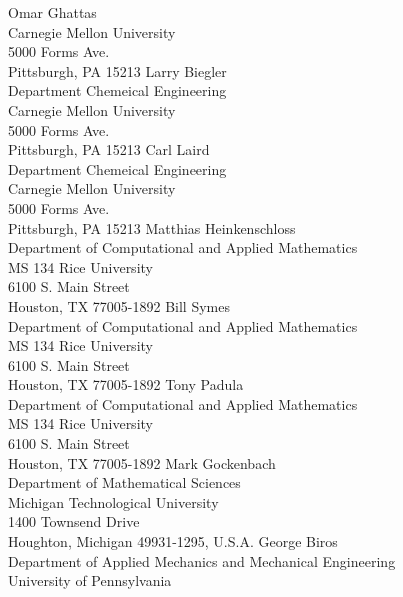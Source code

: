 \documentclass[pdf,ps2pdf,11pt]{SANDreport}
\begin{document}
%
\appendix


\begin{SANDdistribution}
 Omar Ghattas \\ Carnegie Mellon University\\5000 Forms Ave.\\Pittsburgh, PA 15213
 Larry Biegler \\ Department Chemeical Engineering\\Carnegie Mellon University\\5000 Forms Ave.\\Pittsburgh, PA 15213
 Carl Laird \\ Department Chemeical Engineering\\Carnegie Mellon University\\5000 Forms Ave.\\Pittsburgh, PA 15213
 Matthias Heinkenschloss \\ Department of Computational and Applied Mathematics\\MS 134 Rice University\\
6100 S. Main Street\\Houston, TX 77005-1892
 Bill Symes\\Department of Computational and Applied Mathematics\\MS 134 Rice University\\
6100 S. Main Street\\Houston, TX 77005-1892
 Tony Padula\\Department of Computational and Applied Mathematics\\MS 134 Rice University\\
6100 S. Main Street\\Houston, TX 77005-1892
 Mark Gockenbach \\ Department of Mathematical Sciences\\Michigan Technological University\\ 
1400 Townsend Drive\\Houghton, Michigan 49931-1295, U.S.A.
 George Biros \\ Department of Applied Mechanics and Mechanical Engineering\\University of Pennsylvania\\

\end{SANDdistribution}
\end{document}
